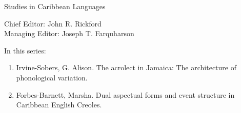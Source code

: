 {\large Studies in Caribbean Languages}

\bigskip

Chief Editor: John R. Rickford\\
Managing Editor: Joseph T. Farquharson

\bigskip

In this series:

\begin{enumerate}
\item Irvine-Sobers,  G. Alison. The acrolect in Jamaica: The architecture of phonological variation.
\item Forbes-Barnett, Marsha. Dual aspectual forms and event structure in Caribbean English Creoles.
\end{enumerate}


\vfill

